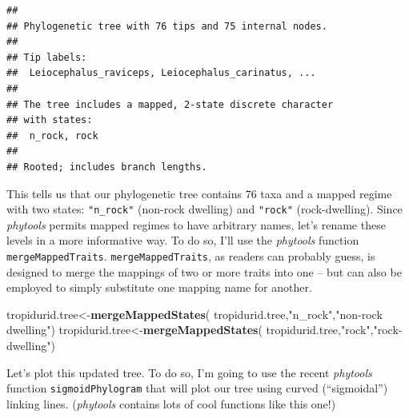 \documentclass[fleqn,10pt,lineno]{wlpeerj} %
\newenvironment{Shaded}{\begin{snugshade}}{\end{snugshade}}
\newcommand{\FunctionTok}[1]{\textcolor[rgb]{0.13,0.29,0.53}{\textbf{#1}}}
\newcommand{\NormalTok}[1]{#1}
\newcommand{\OtherTok}[1]{\textcolor[rgb]{0.56,0.35,0.01}{#1}}
\newcommand{\StringTok}[1]{\textcolor[rgb]{0.31,0.60,0.02}{#1}}
\begin{document}
\begin{verbatim}
## 
## Phylogenetic tree with 76 tips and 75 internal nodes.
## 
## Tip labels:
##  Leiocephalus_raviceps, Leiocephalus_carinatus, ...
## 
## The tree includes a mapped, 2-state discrete character
## with states:
##  n_rock, rock
## 
## Rooted; includes branch lengths.
\end{verbatim}

This tells us that our phylogenetic tree contains 76 taxa and a mapped regime with two states: \texttt{"n\_rock"} (non-rock dwelling) and \texttt{"rock"} (rock-dwelling). Since \emph{phytools} permits mapped regimes to have arbitrary names, let's rename these levels in a more informative way. To do so, I'll use the \emph{phytools} function \texttt{mergeMappedTraits}. \texttt{mergeMappedTraits}, as readers can probably guess, is designed to merge the mappings of two or more traits into one -- but can also be employed to simply substitute one mapping name for another.

\begin{Shaded}
\begin{Highlighting}[]
\NormalTok{tropidurid.tree}\OtherTok{\textless{}{-}}\FunctionTok{mergeMappedStates}\NormalTok{(}
\NormalTok{  tropidurid.tree,}\StringTok{"n\_rock"}\NormalTok{,}\StringTok{"non{-}rock dwelling"}\NormalTok{)}
\NormalTok{tropidurid.tree}\OtherTok{\textless{}{-}}\FunctionTok{mergeMappedStates}\NormalTok{(}
\NormalTok{  tropidurid.tree,}\StringTok{"rock"}\NormalTok{,}\StringTok{"rock{-}dwelling"}\NormalTok{)}
\end{Highlighting}
\end{Shaded}

Let's plot this updated tree. To do so, I'm going to use the recent \emph{phytools} function \texttt{sigmoidPhylogram} that will plot our tree using curved (``sigmoidal'') linking lines. (\emph{phytools} contains lots of cool functions like this one!)
\end{document}
